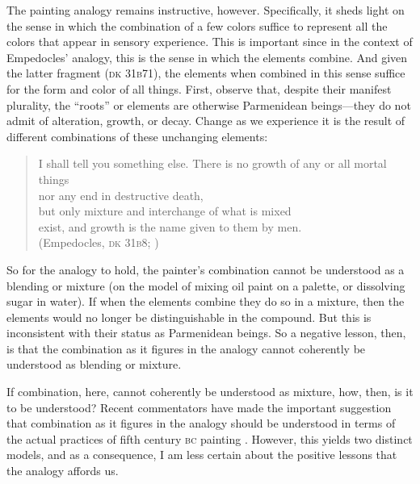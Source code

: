 The painting analogy remains instructive, however. Specifically, it sheds light on the sense in which the combination of a few colors suffice to represent all the colors that appear in sensory experience. This is important since in the context of Empedocles' analogy, this is the sense in which the elements combine. And given the latter fragment (\textsc{dk} 31\textsc{b}71), the elements when combined in this sense suffice for the form and color of all things. First, observe that, despite their manifest plurality, the ``roots'' or elements are otherwise Parmenidean beings---they do not admit of alteration, growth, or decay. Change as we experience it is the result of different combinations of these unchanging elements:
\begin{verse}
    I shall tell you something else. There is no growth of any or all mortal things\\
    nor any end in destructive death,\\
    but only mixture and interchange of what is mixed\\
    exist, and growth is the name given to them by men.\\
    (Empedocles, \textsc{dk} 31\textsc{b}8; \citealt[21 221]{Inwood:2001ve})
\end{verse}
So for the analogy to hold, the painter's combination cannot be understood as a blending or mixture (on the model of mixing oil paint on a palette, or dissolving sugar in water). If when the elements combine they do so in a mixture, then the elements would no longer be distinguishable in the compound. But this is inconsistent with their status as Parmenidean beings. So a negative lesson, then, is that the combination as it figures in the analogy cannot coherently be understood as blending or mixture.

If combination, here, cannot coherently be understood as mixture, how, then, is it to be understood? Recent commentators have made the important suggestion that combination as it figures in the analogy should be understood in terms of the actual practices of fifth century \textsc{bc} painting \citep{Wright:1981zr,Mourelatos:1987fk,Ierodiakonou:2005fk}. However, this yields two distinct models, and as a consequence, I am less certain about the positive lessons that the analogy affords us.

